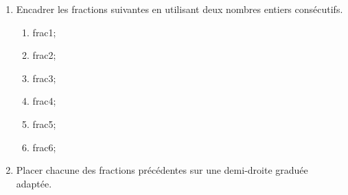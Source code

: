 \documentclass[exercice]{thedocument}%
\begin{document}
%
\begin{enumerate}
    \item Encadrer les fractions suivantes en utilisant deux nombres entiers
    consécutifs.
    \begin{enumerate}
        \item \<frac1;
        \item \<frac2;
        \item \<frac3;
        \item \<frac4;
        \item \<frac5;
        \item \<frac6;
    \end{enumerate}
    \item Placer chacune des fractions précédentes sur une demi-droite graduée
    adaptée.
\end{enumerate}
\end{document}
